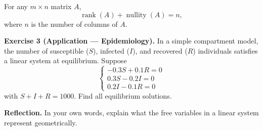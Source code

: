 \documentclass{amsart}
\newcommand{\rank}{\operatorname{rank}}
\newcommand{\nullity}{\operatorname{nullity}}
\begin{document}
\vspace{1em}

\begin{thm}
For any $m \times n$ matrix $A$,
\[
\rank(A) + \nullity(A) = n,
\]
where $n$ is the number of columns of $A$.
\end{thm}

\vspace{2em}

\textbf{Exercise 3 (Application --- Epidemiology).} In a simple compartment model, the number of susceptible ($S$), infected ($I$), and recovered ($R$) individuals satisfies a linear system at equilibrium. Suppose
\[
\begin{cases}
-0.3S + 0.1R = 0 \\
0.3S - 0.2I = 0 \\
0.2I - 0.1R = 0
\end{cases}
\]
with $S + I + R = 1000$. Find all equilibrium solutions.
\begin{work}
\end{work}

\vspace{2em}

\textbf{Reflection.} In your own words, explain what the free variables in a linear system represent geometrically.
\begin{work}
\end{work}
\end{document}
